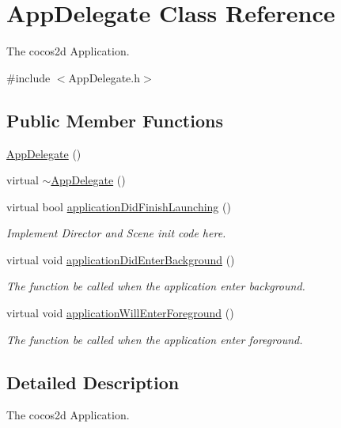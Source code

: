 \hypertarget{class_app_delegate}{\section{\-App\-Delegate \-Class \-Reference}
\label{class_app_delegate}
}


\-The cocos2d \-Application.  




{\ttfamily \#include $<$\-App\-Delegate.\-h$>$}

\subsection*{\-Public \-Member \-Functions}
\begin{DoxyCompactItemize}
\item 
\hyperlink{class_app_delegate_a7d26ade6fbc9d35ecc9185792303f82d}{\-App\-Delegate} ()
\item 
virtual \hyperlink{class_app_delegate_a9f89424b5e296e3668deaa0265fc5ac1}{$\sim$\-App\-Delegate} ()
\item 
virtual bool \hyperlink{class_app_delegate_a68cbaed49edf7581dc59a09d5062fff3}{application\-Did\-Finish\-Launching} ()
\begin{DoxyCompactList}\small\item\em \-Implement \-Director and \-Scene init code here. \end{DoxyCompactList}\item 
virtual void \hyperlink{class_app_delegate_a17cb09777419781698324e0415bffd3a}{application\-Did\-Enter\-Background} ()
\begin{DoxyCompactList}\small\item\em \-The function be called when the application enter background. \end{DoxyCompactList}\item 
virtual void \hyperlink{class_app_delegate_ac4d653e3f74a91efef5f2def58fe3108}{application\-Will\-Enter\-Foreground} ()
\begin{DoxyCompactList}\small\item\em \-The function be called when the application enter foreground. \end{DoxyCompactList}\end{DoxyCompactItemize}


\subsection{\-Detailed \-Description}
\-The cocos2d \-Application. 

